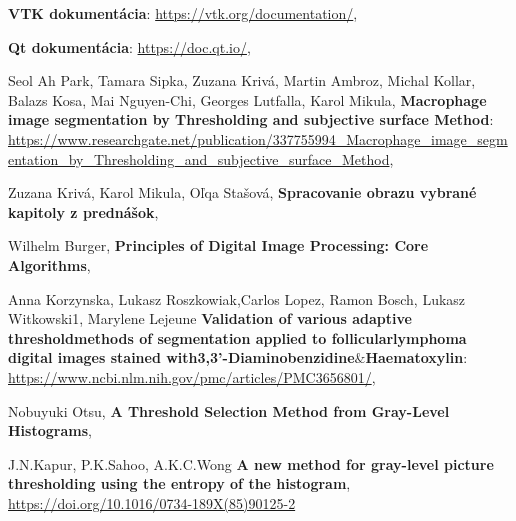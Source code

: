 \documentclass[a4paper,11pt,oneside]{article}%
\begin{document}
\newpage
\begin{thebibliography}{50}

\textbf{VTK dokumentácia}:
\url{https://vtk.org/documentation/},

\textbf{Qt dokumentácia}:
\url{https://doc.qt.io/},

Seol Ah Park, Tamara Sipka, Zuzana Krivá, Martin Ambroz, Michal Kollar, Balazs Kosa, Mai Nguyen-Chi, Georges Lutfalla, Karol Mikula, \textbf{Macrophage image segmentation by Thresholding and subjective surface Method}: \\ 
\url{https://www.researchgate.net/publication/337755994_Macrophage_image_segmentation_by_Thresholding_and_subjective_surface_Method},

Zuzana Krivá, Karol Mikula, Oľqa Stašová, \textbf{Spracovanie obrazu vybrané kapitoly z prednášok}, 

Wilhelm Burger, \textbf{Principles of Digital Image Processing: Core Algorithms},

Anna Korzynska, Lukasz Roszkowiak,Carlos Lopez, Ramon Bosch, Lukasz Witkowski1,  Marylene Lejeune \textbf{Validation of various adaptive thresholdmethods of segmentation applied to follicularlymphoma digital images stained with3,3’-Diaminobenzidine$\&$Haematoxylin}: 
\url{https://www.ncbi.nlm.nih.gov/pmc/articles/PMC3656801/},

Nobuyuki Otsu, \textbf{A Threshold Selection Method from Gray-Level Histograms}, 

J.N.Kapur, P.K.Sahoo, A.K.C.Wong
\textbf{A new method for gray-level picture thresholding using the entropy of the histogram},
\url{https://doi.org/10.1016/0734-189X(85)90125-2}
\end{thebibliography}
\end{document}
